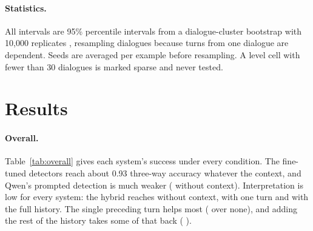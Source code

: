 \documentclass{article}
\begin{document}
\paragraph{Statistics.}
All intervals are 95\% percentile intervals from a dialogue-cluster bootstrap with 10{,}000
replicates \citep{efron1993bootstrap}, resampling dialogues because turns from one dialogue are
dependent. Seeds are averaged per example before resampling. A level cell with fewer than 30
dialogues is marked sparse and never tested.

\section{Results}
\label{sec:results}

\begin{table}[t]
  \caption{Overall success by context condition on test. Detection is three-way Stage~1
  accuracy over all examples; interp.\ is request interpretation on gold requests. DeBERTa and
  the hybrid are on the matched line; TF-IDF and Qwen have one model each (test-time line). The
  last column is the test-time \texttt{full}$-$\texttt{mismatched} control.}
  \label{tab:overall}
  \centering
  \small
  
\end{table}

\paragraph{Overall.}
Table~\ref{tab:overall} gives each system's success under every condition. The fine-tuned
detectors reach about 0.93 three-way accuracy whatever the context, and Qwen's prompted detection
is much weaker (\QwenDetNone{} without context). Interpretation is low for every system: the hybrid
reaches \HybridInterpNone{} without context, \HybridInterpOne{} with one turn and
\HybridInterpFull{} with the full history. The single preceding turn helps most
(\OneNoneEst{} \OneNoneCI{} over none), and adding the rest of the history takes some of that
back (\FullOneEst{} \FullOneCI).

\begin{table}[t]
  \caption{The preregistered test and the Holm-adjusted secondary family. Contrasts are
  L2$-$L0 linear trends unless named otherwise; H3 rows compare each system's test-time
  \texttt{full}$-$\texttt{none} benefit with the hybrid's on the named endpoint.}
  \label{tab:confirmatory}
  \centering
  \small
  
\end{table}
\end{document}
